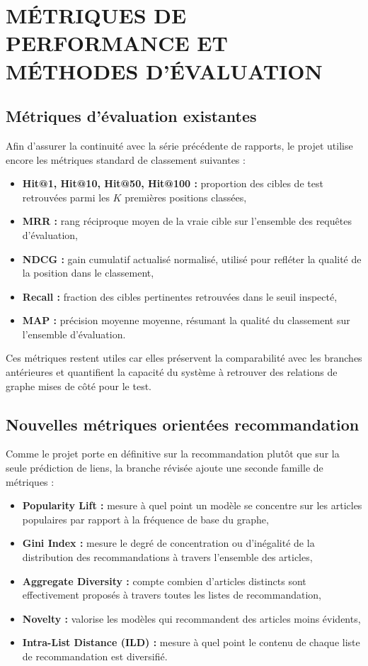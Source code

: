 \chapter{MÉTRIQUES DE PERFORMANCE ET MÉTHODES D'ÉVALUATION}
\thispagestyle{empty}

\section{Métriques d'évaluation existantes}

Afin d'assurer la continuité avec la série précédente de rapports, le projet
utilise encore les métriques standard de classement suivantes :
\begin{itemize}
    \item \textbf{Hit@1, Hit@10, Hit@50, Hit@100 :} proportion des cibles de
    test retrouvées parmi les $K$ premières positions classées,
    \item \textbf{MRR :} rang réciproque moyen de la vraie cible sur l'ensemble
    des requêtes d'évaluation,
    \item \textbf{NDCG :} gain cumulatif actualisé normalisé, utilisé pour
    refléter la qualité de la position dans le classement,
    \item \textbf{Recall :} fraction des cibles pertinentes retrouvées dans le
    seuil inspecté,
    \item \textbf{MAP :} précision moyenne moyenne, résumant la qualité du
    classement sur l'ensemble d'évaluation.
\end{itemize}

Ces métriques restent utiles car elles préservent la comparabilité avec les
branches antérieures et quantifient la capacité du système à retrouver des
relations de graphe mises de côté pour le test.

\section{Nouvelles métriques orientées recommandation}

Comme le projet porte en définitive sur la recommandation plutôt que sur la
seule prédiction de liens, la branche révisée ajoute une seconde famille de
métriques :
\begin{itemize}
    \item \textbf{Popularity Lift :} mesure à quel point un modèle se
    concentre sur les articles populaires par rapport à la fréquence de base du
    graphe,
    \item \textbf{Gini Index :} mesure le degré de concentration ou
    d'inégalité de la distribution des recommandations à travers l'ensemble des
    articles,
    \item \textbf{Aggregate Diversity :} compte combien d'articles distincts
    sont effectivement proposés à travers toutes les listes de recommandation,
    \item \textbf{Novelty :} valorise les modèles qui recommandent des articles
    moins évidents,
    \item \textbf{Intra-List Distance (ILD) :} mesure à quel point le contenu
    de chaque liste de recommandation est diversifié.
\end{itemize}

